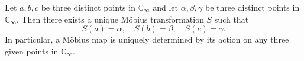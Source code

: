 Let $a, b, c$ be three distinct points in $\mathbb{C}_\infty$ and let $\alpha, \beta, \gamma$ be three distinct points in $\mathbb{C}_\infty$. Then there exists a unique Möbius transformation $S$ such that
$$S(a) = \alpha, \quad S(b) = \beta, \quad S(c) = \gamma.$$
In particular, a Möbius map is uniquely determined by its action on any three given points in $\mathbb{C}_\infty$.
